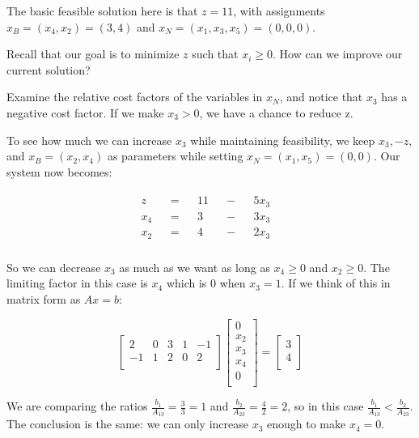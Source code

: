 The basic feasible solution here is that $z = 11$, with assignments $x_B = (x_4, x_2) = (3,4)$ and $x_N = (x_1,x_3,x_5) = (0,0,0)$.

Recall that our goal is to minimize $z$ such that $x_i \geq 0$.  How can we improve our current solution?

Examine the relative cost factors of the variables in $x_N$, and notice that $x_3$ has a negative cost factor. If we make $x_3 > 0$, we have a chance to reduce z.

To see how much we can increase $x_3$ while maintaining feasibility, we keep $x_3, -z,$ and $x_B = (x_2, x_4)$ as parameters while setting $x_N = (x_1,x_5) = (0,0)$.  Our system now becomes:

\begin{eqnarray}
\begin{aligned}
z && = && 11 && - && 5x_3 & \\
x_4 &&=&& 3 && - &&3x_3 &\\
x_2 &&=&& 4 && - && 2x_3 &\\
\end{aligned}
\end{eqnarray}

So we can decrease $x_3$ as much as we want as long as $x_4 \geq 0$ and $x_2 \geq 0$.  The limiting factor in this case is $x_4$ which is 0 when $x_3 = 1$. If we think of this in matrix form as $Ax = b$:

\begin{equation}
\begin{bmatrix}
2 & 0 & 3 & 1 & -1 \\
-1 & 1 & 2 & 0 & 2 \\
\end{bmatrix}
\begin{bmatrix}
0\\x_2\\x_3\\x_4\\0\\
\end{bmatrix}
=
\begin{bmatrix}
3\\4\\
\end{bmatrix}
\end{equation}

We are comparing the ratios $\frac{b_1}{A_{13}} = \frac{3}{3} = 1$ and $\frac{b_2}{A_{23}} = \frac{4}{2} = 2$, so in this case $\frac{b_1}{A_{13}} < \frac{b_2}{A_{23}}$.  The conclusion is the same: we can only increase $x_3$ enough to make $x_4 = 0$.

